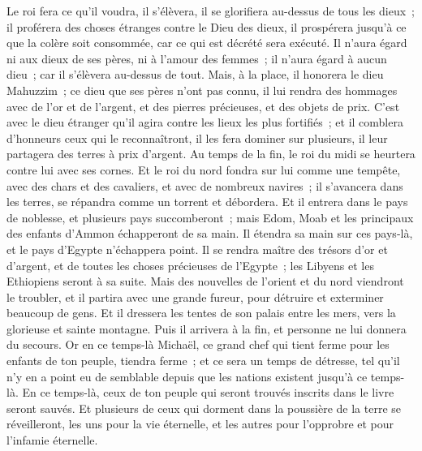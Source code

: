 \begin{multicols}{2}
Le roi fera ce qu'il voudra, il s'élèvera, il se glorifiera au-dessus de tous les dieux~; il proférera des choses étranges contre le Dieu des dieux, il prospérera jusqu'à ce que la colère soit consommée, car ce qui est décrété sera exécuté.
Il n'aura égard ni aux dieux de ses pères, ni à l'amour des femmes~; il n'aura égard à aucun dieu~; car il s'élèvera au-dessus de tout.
Mais, à la place, il honorera le dieu Mahuzzim~; ce dieu que ses pères n'ont pas connu, il lui rendra des hommages avec de l'or et de l'argent, et des pierres précieuses, et des objets de prix.
C'est avec le dieu étranger qu'il agira contre les lieux les plus fortifiés~; et il comblera d'honneurs ceux qui le reconnaîtront, il les fera dominer sur plusieurs, il leur partagera des terres à prix d'argent.
Au temps de la fin, le roi du midi se heurtera contre lui avec ses cornes. Et le roi du nord fondra sur lui comme une tempête, avec des chars et des cavaliers, et avec de nombreux navires~; il s'avancera dans les terres, se répandra comme un torrent et débordera.
Et il entrera dans le pays de noblesse, et plusieurs pays succomberont~; mais Edom, Moab et les principaux des enfants d'Ammon échapperont de sa main.
Il étendra sa main sur ces pays-là, et le pays d'Egypte n'échappera point.
Il se rendra maître des trésors d'or et d'argent, et de toutes les choses précieuses de l'Egypte~; les Libyens et les Ethiopiens seront à sa suite.
Mais des nouvelles de l'orient et du nord viendront le troubler, et il partira avec une grande fureur, pour détruire et exterminer beaucoup de gens.
Et il dressera les tentes de son palais entre les mers, vers la glorieuse et sainte montagne. Puis il arrivera à la fin, et personne ne lui donnera du secours.
\VerseOne{}Or en ce temps-là Michaël, ce grand chef qui tient ferme pour les enfants de ton peuple, tiendra ferme~; et ce sera un temps de détresse, tel qu'il n'y en a point eu de semblable depuis que les nations existent jusqu'à ce temps-là. En ce temps-là, ceux de ton peuple qui seront trouvés inscrits dans le livre seront sauvés.
Et plusieurs de ceux qui dorment dans la poussière de la terre se réveilleront, les uns pour la vie éternelle, et les autres pour l'opprobre et pour l'infamie éternelle.

\end{multicols}
